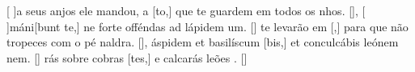 {    {[ ]{a} seus anjos ele mandou, a [to,] que te guardem em todos os nhos. [\LinkPT]},
  {[ ]{má}ni[bunt te,] ne forte offéndas ad lápidem um. [\LinkLA]}%
    { te levarão em [,] para que não tropeces com o pé naldra. [\LinkPT]},
  { áspidem et basilíscum [bis,] et conculcábis leónem nem. [\LinkLA]}%
    {rás sobre cobras [tes,] e calcarás leões . [\LinkPT]}
}